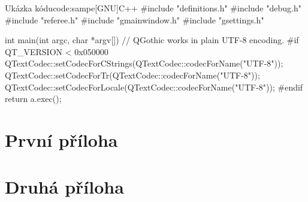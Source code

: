 \documentclass[a4paper,12pt]{article}
\begin{document}
\begin{upcode}{Ukázka kódu}{code:sampe}{[GNU]C++}
#include "definitions.h"
#include "debug.h"
#include "referee.h"
#include "gmainwindow.h"
#include "gsettings.h"

int main(int argc, char *argv[]) {
    // QGothic works in plain UTF-8 encoding.
#if QT_VERSION < 0x050000
    QTextCodec::setCodecForCStrings(QTextCodec::codecForName("UTF-8"));
    QTextCodec::setCodecForTr(QTextCodec::codecForName("UTF-8"));
    QTextCodec::setCodecForLocale(QTextCodec::codecForName("UTF-8"));
#endif
    return a.exec();
}
\end{upcode}


\begin{upconclusions}[czech]						%
\end{upconclusions}

\begin{upconclusions}[english]						%
\end{upconclusions}

\upprintbibliography								%

\upappendix
\section{První příloha}

\section{Druhá příloha}

\upprintindex										%
\end{document}

